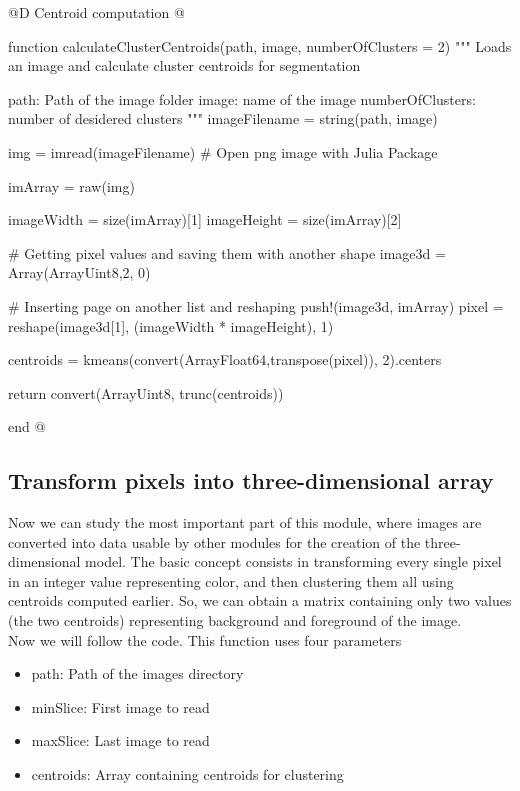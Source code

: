 \documentclass[11pt,oneside]{article}	%
\begin{document}
@D Centroid computation
@{function calculateClusterCentroids(path, image, numberOfClusters = 2)
  """
  Loads an image and calculate cluster centroids for segmentation

  path: Path of the image folder
  image: name of the image
  numberOfClusters: number of desidered clusters
  """
  imageFilename = string(path, image)

  img = imread(imageFilename) # Open png image with Julia Package

  imArray = raw(img)

  imageWidth = size(imArray)[1]
  imageHeight = size(imArray)[2]

  # Getting pixel values and saving them with another shape
  image3d = Array(Array{Uint8,2}, 0)

  # Inserting page on another list and reshaping
  push!(image3d, imArray)
  pixel = reshape(image3d[1], (imageWidth * imageHeight), 1)

  centroids = kmeans(convert(Array{Float64},transpose(pixel)), 2).centers

  return convert(Array{Uint8}, trunc(centroids))

end
@}

\subsection{Transform pixels into three-dimensional array}\label{sec:transformation}

Now we can study the most important part of this module, where images are converted into data usable by other modules for the creation of the three-dimensional model. The basic concept consists in transforming every single pixel in an integer value representing color, and then clustering them all using centroids computed earlier. So, we can obtain a matrix containing only two values (the two centroids) representing background and foreground of the image.\\
Now we will follow the code. This function uses four parameters

\begin{itemize}
 \item path: Path of the images directory
 \item minSlice: First image to read
 \item maxSlice: Last image to read
 \item centroids: Array containing centroids for clustering
\end{itemize}
\end{document}
